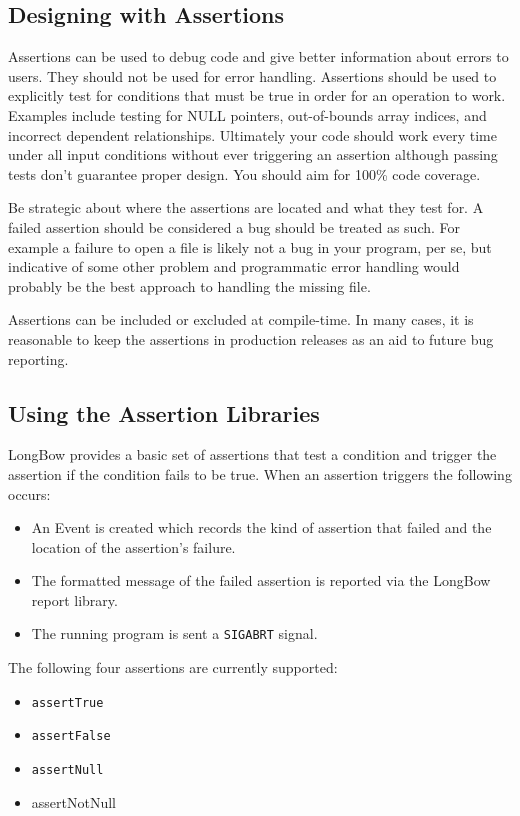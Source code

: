 \subsection{Designing with Assertions }
Assertions can be used to debug code and give better information about errors to users.
They should not be used for error handling.
Assertions should be used to explicitly test for conditions that must be true in order for an operation to work. Examples include testing for NULL pointers, out-of-bounds array indices, and incorrect dependent relationships. Ultimately your code should work every time under all input conditions without ever triggering an assertion although passing tests don't guarantee proper design. You should aim for 100\% code coverage.

Be strategic about where the assertions are located and what they test for.
A failed assertion should be considered a bug should be treated as such.
For example a failure to open a file is likely not a bug in your program, per se, but indicative of some other problem and programmatic error handling would probably be the best approach to handling the missing file.

Assertions can be included or excluded at compile-time. In many cases, it is reasonable to keep the assertions in production releases as an aid to future bug reporting.
  
\subsection{Using the Assertion Libraries }  

LongBow provides a basic set of assertions that test a condition and trigger the assertion if the condition fails to be true. When an assertion triggers the following occurs:
\begin{itemize}
\item An Event is created which records the kind of assertion that failed and the location of the assertion's failure.
\item The formatted message of the failed assertion is reported via the LongBow report library.
\item The running program is sent a {\tt SIGABRT} signal.
\end{itemize}

The following four assertions are currently supported:
\begin{itemize}
\item {\tt assertTrue}
\item {\tt assertFalse}
\item {\tt assertNull}
\item {\ttfamily assertNotNull}
\end{itemize}

